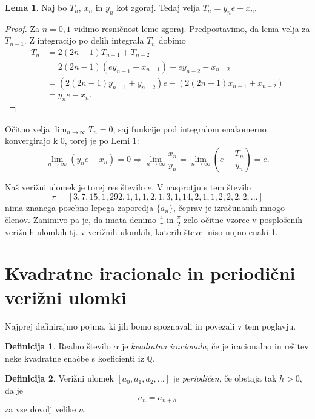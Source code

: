 \documentclass[a4paper,12pt]{article}
\newcommand{\Q}{\mathbb{Q}}
\theoremstyle{definition}
\newtheorem{df}{Definicija}[section]
\theoremstyle{proposition}
\theoremstyle{theorem}
\theoremstyle{lemma}
\newtheorem{lem}{Lema}[section]
\begin{document}
\begin{lem}
\label{rekurzija}
Naj bo $T_n$, $x_n$ in $y_n$ kot zgoraj. Tedaj velja $T_n=y_n e-x_n$.
\end{lem}
\begin{proof}
Za $n=0,1$ vidimo resničnost leme zgoraj. Predpostavimo, da lema velja za $T_{n-1}$. Z integracijo po delih integrala $T_n$ dobimo 
\begin{equation*}
\begin{split}
T_n &= 2(2n-1)T_{n-1}+T_{n-2} \\
&=2(2n-1)(e y_{n-1} -x_{n-1}) + e y_{n-2} -x_{n-2} \\
&=(2(2n-1)y_{n-1}+y_{n-2})e - (2(2n-1)x_{n-1}+x_{n-2}) \\
&=y_n e - x_n.
\end{split}
\end{equation*}
\end{proof}

Očitno velja $\lim_{n\to\infty}T_n =0$, saj funkcije pod integralom enakomerno konvergirajo k 0, torej je po Lemi \ref{rekurzija}:
\[ \lim_{n\to\infty}(y_ne-x_n) = 0 \Rightarrow \lim_{n\to\infty}\frac{x_n}{y_n}=\lim_{n\to\infty}(e-\frac{T_n}{y_n}) =e. \]

Naš verižni ulomek je torej res število $e$. V nasprotju s tem število
$$\pi=[3, 7, 15, 1, 292, 1, 1, 1, 2, 1, 3, 1, 14, 2, 1, 1, 2, 2, 2, 2, ...]$$
nima znanega posebno lepega zaporedja $\{a_n\}$, čeprav je izračunanih mnogo členov. Zanimivo pa je, da imata denimo $\frac{4}{\pi}$ in $\frac{\pi}{2}$ zelo očitne vzorce v posplošenih verižnih ulomkih tj. v verižnih ulomkih, katerih števci niso nujno enaki 1.

\section{Kvadratne iracionale in periodični verižni ulomki} \label{periode}

Najprej definirajmo pojma, ki jih bomo spoznavali in povezali v tem poglavju.

\begin{df}
Realno število $\alpha$ je \textit{kvadratna iracionala}, če je iracionalno in rešitev neke kvadratne enačbe s koeficienti iz $\Q$.
\end{df}
\begin{df}
Verižni ulomek $[a_0, a_1, a_2, ...]$ je \textit{periodičen}, če obstaja tak $h>0$, da je $$a_n=a_{n+h}$$ za vse dovolj velike $n$.
\end{df}
\end{document}
